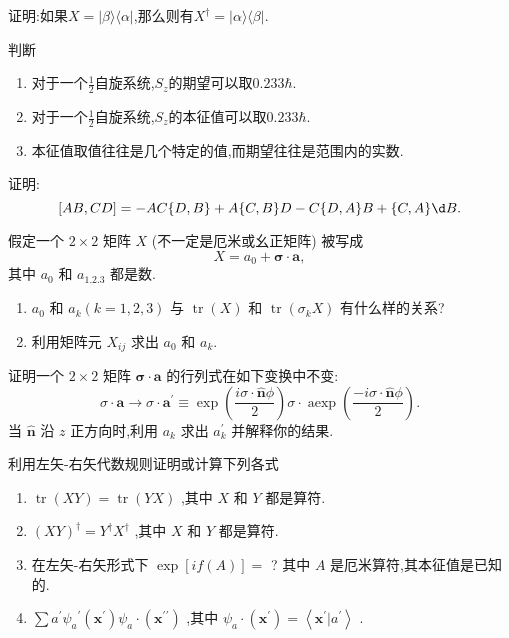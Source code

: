 \documentclass[lang=cn,newtx,10pt,scheme=chinese,thmcnt=section]{elegantbook}
\begin{document}
\begin{problemset}
	\item 证明:如果$X=|\beta\rangle\langle\alpha|$,那么则有$X^\dagger=|\alpha\rangle\langle\beta|$.
	\item 判断
	\begin{enumerate}
		\item 对于一个$\frac12$自旋系统,$S_z$的期望可以取$0.233\hbar$.
		\item 对于一个$\frac12$自旋系统,$S_z$的本征值可以取$0.233\hbar$.
		\item 本征值取值往往是几个特定的值,而期望往往是范围内的实数.
	\end{enumerate}
	\item 证明:
	$$
	\left\lbrack {{AB},{CD}}\right\rbrack = - {AC}\{ D, B\} + A\{ C, B\} D - C\{ D, A\} B + \{ C, A\} {\d B}.
	$$
	\item 假定一个 $2 \times 2$ 矩阵 $X$ (不一定是厄米或幺正矩阵) 被写成
	$$
	X = {a}_{0} + \mathbf{\sigma } \cdot \mathbf{a},
	$$
	其中 ${a}_{0}$ 和 ${a}_{1.2.3}$ 都是数.
		\begin{enumerate}
		\item ${a}_{0}$ 和 ${a}_{k}\left( {k = 1,2,3}\right)$ 与 $\operatorname{tr}\left( X\right)$ 和 $\operatorname{tr}\left( {{\sigma }_{k}X}\right)$ 有什么样的关系?
		\item 利用矩阵元 ${X}_{ij}$ 求出 ${a}_{0}$ 和 ${a}_{k}$.
		\end{enumerate}
	\item 证明一个 $2 \times 2$ 矩阵 $\mathbf{\sigma } \cdot \mathbf{a}$ 的行列式在如下变换中不变:
	$$
	\sigma \cdot \mathbf{a} \rightarrow \sigma \cdot {\mathbf{a}}^{\prime } \equiv \exp \left( \frac{{i\sigma } \cdot \widehat{\mathbf{n}}\phi }{2}\right) \sigma \cdot \operatorname{aexp}\left( \frac{-{i\sigma } \cdot \widehat{\mathbf{n}}\phi }{2}\right) .
	$$
	当 $\widehat{\mathbf{n}}$ 沿 $z$ 正方向时,利用 ${a}_{k}$ 求出 ${a}_{k}^{\prime }$ 并解释你的结果.
	\item 利用左矢-右矢代数规则证明或计算下列各式
	\begin{enumerate}
		\item $\operatorname{tr}\left( {XY}\right) = \operatorname{tr}\left( {YX}\right)$ ,其中 $X$ 和 $Y$ 都是算符.
		\item ${\left( XY\right) }^{ \dagger } = {Y}^{ \dagger }{X}^{ \dagger }$ ,其中 $X$ 和 $Y$ 都是算符.
		\item 在左矢-右矢形式下 $\exp \left\lbrack {{if}\left( A\right) }\right\rbrack =$ ? 其中 $A$ 是厄米算符,其本征值是已知的.
		\item $\sum {a}^{\prime }{\psi }_{a}{}^{\prime }\left( {\mathbf{x}}^{\prime }\right) {\psi }_{a} \cdot \left( {\mathbf{x}}^{\prime \prime }\right)$ ,其中 ${\psi }_{a} \cdot \left( {\mathbf{x}}^{\prime }\right) = \left\langle {{\mathbf{x}}^{\prime } | {a}^{\prime }}\right\rangle$ .

\end{enumerate}
\end{problemset}
\end{document}
